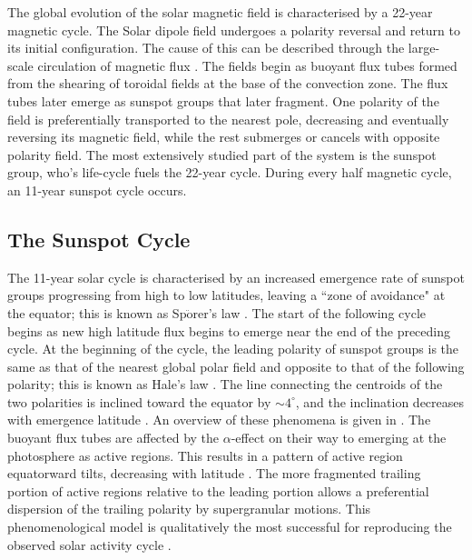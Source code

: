 The global evolution of the solar magnetic field is characterised by a 22-year magnetic cycle. The Solar dipole field undergoes a polarity reversal and return to its initial configuration. The cause of this can be described through the large-scale circulation of magnetic flux \citep{Babcock:1961, Leighton:1964}. The fields begin as buoyant flux tubes formed from the shearing of toroidal fields at the base of the convection zone. The flux tubes later emerge as sunspot groups that later fragment. One polarity of the field is preferentially transported to the nearest pole, decreasing and eventually reversing its magnetic field, while the rest submerges or cancels with opposite polarity field. The most extensively studied part of the system is the sunspot group, who's life-cycle fuels the 22-year cycle. During every half magnetic cycle, an 11-year sunspot cycle occurs.

\subsection{The Sunspot Cycle}\label{section:sscycle}

The 11-year solar cycle is characterised by an increased emergence rate of sunspot groups progressing from high to low latitudes, leaving a ``zone of avoidance" at the equator; this is known as Sp$\ddot{\mbox{o}}$rer's law \citep{Maunder:1904}. The start of the following cycle begins as new high latitude flux begins to emerge near the end of the preceding cycle. At the beginning of the cycle, the leading polarity of sunspot groups is the same as that of the nearest global polar field and opposite to that of the following polarity; this is known as Hale's law \citep{Hale:1919}. The line connecting the centroids of the two polarities is inclined toward the equator \citep[``Joy's Law";][]{Hale:1919} by $\sim$$4^\circ$, and the inclination decreases with emergence latitude \citep{Howard:1991}. An overview of these phenomena is given in \citet{Hathaway:2010b}. The buoyant flux tubes are affected by the $\alpha$-effect \citep[as a result of the Coriolis effect;][and references therein]{Fan:2009} on their way to emerging at the photosphere as active regions. This results in a pattern of active region equatorward tilts, decreasing with latitude \citep{Howard:1991}. The more fragmented trailing portion of active regions relative to the leading portion allows a preferential dispersion of the trailing polarity by supergranular motions. This phenomenological model is qualitatively the most successful for reproducing the observed solar activity cycle \citep{Nandy:2001}.


